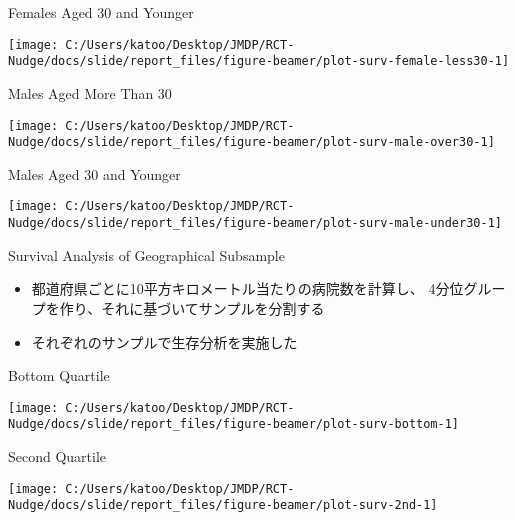 \documentclass[
      aspectratio=169,
        12pt,
    ]{beamer}
\providecommand{\tightlist}{%
  \setlength{\itemsep}{0pt}\setlength{\parskip}{0pt}}
\begin{document}
\begin{frame}{Females Aged 30 and Younger}
\protect\hypertarget{females-aged-30-and-younger}{}
\begin{center}\texttt{[image: C:/Users/katoo/Desktop/JMDP/RCT-Nudge/docs/slide/report\_files/figure-beamer/plot-surv-female-less30-1]} \end{center}
\end{frame}

\begin{frame}{Males Aged More Than 30}
\protect\hypertarget{males-aged-more-than-30}{}
\begin{center}\texttt{[image: C:/Users/katoo/Desktop/JMDP/RCT-Nudge/docs/slide/report\_files/figure-beamer/plot-surv-male-over30-1]} \end{center}
\end{frame}

\begin{frame}{Males Aged 30 and Younger}
\protect\hypertarget{males-aged-30-and-younger}{}
\begin{center}\texttt{[image: C:/Users/katoo/Desktop/JMDP/RCT-Nudge/docs/slide/report\_files/figure-beamer/plot-surv-male-under30-1]} \end{center}
\end{frame}

\begin{frame}{Survival Analysis of Geographical Subsample}
\protect\hypertarget{survival-analysis-of-geographical-subsample}{}
\begin{itemize}
\tightlist
\item
  都道府県ごとに10平方キロメートル当たりの病院数を計算し、
  4分位グループを作り、それに基づいてサンプルを分割する
\item
  それぞれのサンプルで生存分析を実施した
\end{itemize}
\end{frame}

\begin{frame}{Bottom Quartile}
\protect\hypertarget{bottom-quartile}{}
\begin{center}\texttt{[image: C:/Users/katoo/Desktop/JMDP/RCT-Nudge/docs/slide/report\_files/figure-beamer/plot-surv-bottom-1]} \end{center}
\end{frame}

\begin{frame}{Second Quartile}
\protect\hypertarget{second-quartile}{}
\begin{center}\texttt{[image: C:/Users/katoo/Desktop/JMDP/RCT-Nudge/docs/slide/report\_files/figure-beamer/plot-surv-2nd-1]} \end{center}
\end{frame}
\end{document}
